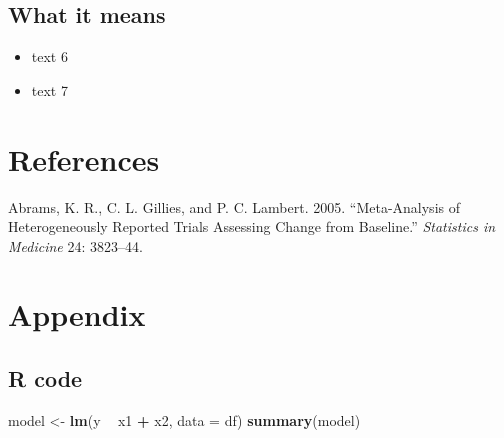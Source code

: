 \documentclass[]{book}
\newenvironment{Shaded}{\begin{snugshade}}{\end{snugshade}}
\newcommand{\DataTypeTok}[1]{\textcolor[rgb]{0.13,0.29,0.53}{#1}}
\newcommand{\KeywordTok}[1]{\textcolor[rgb]{0.13,0.29,0.53}{\textbf{#1}}}
\newcommand{\NormalTok}[1]{#1}
\newcommand{\OperatorTok}[1]{\textcolor[rgb]{0.81,0.36,0.00}{\textbf{#1}}}
\newcommand{\StringTok}[1]{\textcolor[rgb]{0.31,0.60,0.02}{#1}}
\providecommand{\tightlist}{%
  \setlength{\itemsep}{0pt}\setlength{\parskip}{0pt}}
\begin{document}
\hypertarget{what-it-means}{%
\section{What it means}\label{what-it-means}}

\begin{itemize}
\tightlist
\item
  text 6
\item
  text 7
\end{itemize}

\hypertarget{references}{%
\chapter{References}\label{references}}

\hypertarget{refs}{}
\leavevmode\hypertarget{ref-Abrams2005}{}%
Abrams, K. R., C. L. Gillies, and P. C. Lambert. 2005. ``Meta-Analysis of Heterogeneously Reported Trials Assessing Change from Baseline.'' \emph{Statistics in Medicine} 24: 3823--44.

\hypertarget{appendix}{%
\chapter*{Appendix}\label{appendix}}

\hypertarget{r-code}{%
\section*{R code}\label{r-code}}

\begin{Shaded}
\begin{Highlighting}[]
\NormalTok{model <-}\StringTok{ }\KeywordTok{lm}\NormalTok{(y }\OperatorTok{~}\StringTok{ }\NormalTok{x1 }\OperatorTok{+}\StringTok{ }\NormalTok{x2, }\DataTypeTok{data =}\NormalTok{ df)}
\KeywordTok{summary}\NormalTok{(model)}
\end{Highlighting}
\end{Shaded}

\backmatter
\end{document}
